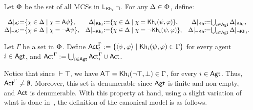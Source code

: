 \begin{definition}
Let $\Upphi$ be the set of all MCSs in $\mathsf{L}_{{\sf Kh}_i,\square}$.
For any $\Delta \in \Upphi$, define:
\begin{spcenter}
\begin{small}
$\begin{array}{@{}r@{:=}lr@{:=}lr@{:=}l@{}}
	\resta{\Delta}    & \setof{\chi \in \Delta}{\chi = \A\psi}, &
	\restkhi{\Delta}  & \setof{\chi \in \Delta}{\chi = \khi(\psi,\varphi)}, &
	\restkh{\Delta}   & \bigcup_{i \in \AGT} \restkhi{\Delta}, \\
%
	\restna{\Delta}   & \setof{\chi \in \Delta}{\chi = \lnot \A\psi}, &
    \restnkhi{\Delta} & \setof{\chi \in \Delta}{\chi = \lnot \khi(\psi,\varphi)}, &
	\restnkh{\Delta}  & \bigcup_{i \in \AGT} \restnkhi{\Delta}.
\end{array}$
\end{small}
\end{spcenter}
%
%

Let $\Gamma$ be a set in $\Upphi$.
Define ${\rm \sf Act}^\Gamma_i := \{ \langle \psi,\varphi \rangle \mid {\sf Kh}_i(\psi,\varphi) \in \Gamma \}$ for every agent $i \in {\rm \sf Agt}$, and ${\rm \sf Act}^\Gamma := \bigcup_{i \in {\rm \sf Agt}} {\rm \sf Act}^\Gamma_i\cup {\rm \sf Act}$.
\end{definition}

\medskip

Notice that since $\vdash \top$, we have ${\sf A}\top = {\sf Kh}_i(\neg\top,\bot) \in \Gamma$, for every $i \in {\rm \sf Agt}$. Thus, ${\rm \sf Act}^\Gamma \neq \emptyset$. Moreover, this set is denumerable since ${\rm \sf Agt}$ is finite and non-empty, and ${\rm \sf Act}$ is denumerable. 
With this property at hand, using a slight variation of what is done in~\cite{AFSVQ21,AFSVQ23report}, the definition of the canonical model is as follows.

\medskip

